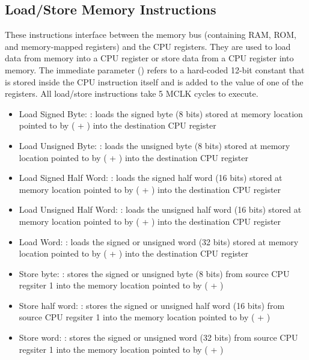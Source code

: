 \documentclass[11pt,pdftex,portrait,letterpaper]{article}
\begin{document}
\subsection{Load/Store Memory Instructions}

These instructions interface between the memory bus (containing RAM, ROM, and memory-mapped registers) and the CPU registers. They are used to load data from memory into a CPU register or store data from a CPU register into memory. The immediate parameter () refers to a hard-coded 12-bit constant that is stored inside the CPU instruction itself and is added to the value of one of the registers. All load/store instructions take 5 MCLK cycles to execute.

\begin{itemize}
	\item Load Signed Byte: : loads the signed byte (8 bits) stored at memory location pointed to by ( + ) into the destination CPU register 
	\item Load Unsigned Byte: : loads the unsigned byte (8 bits) stored at memory location pointed to by ( + ) into the destination CPU register 
	\item Load Signed Half Word: : loads the signed half word (16 bits) stored at memory location pointed to by ( + ) into the destination CPU register 
	\item Load Unsigned Half Word: : loads the unsigned half word (16 bits) stored at memory location pointed to by ( + ) into the destination CPU register 
	\item Load Word: : loads the signed or unsigned word (32 bits) stored at memory location pointed to by ( + ) into the destination CPU register 
	\item Store byte: : stores the signed or unsigned byte (8 bits) from source CPU regsiter 1  into the memory location pointed to by ( + )
	\item Store half word: : stores the signed or unsigned half word (16 bits) from source CPU regsiter 1  into the memory location pointed to by ( + )
	\item Store word: : stores the signed or unsigned word (32 bits) from source CPU regsiter 1  into the memory location pointed to by ( + )
\end{itemize}
\end{document}

